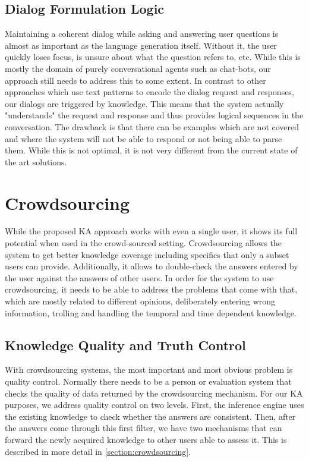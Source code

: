 \subsection{Dialog Formulation Logic}
Maintaining a coherent dialog while asking and answering user questions is 
almost as important as the language generation itself. Without it, the user 
quickly loses focus, is unsure about what the question refers to, etc. 
While this is mostly the domain of purely conversational agents such as 
chat-bots\parencite{Bradesko2012}, our approach still needs to address this to 
some extent. In contrast to other approaches which use text patterns to encode 
the dialog request and responses, our dialogs are triggered by knowledge. 
This means that the system actually "understands" the request and response and 
thus provides logical sequences in the conversation. The drawback is that there
can be examples which are not covered and where the system will not be able to
respond or not being able to parse them. While this is not optimal, it is not 
very different from the current state of the art solutions.

\section{Crowdsourcing}
\label{section:bg:crowdsourcing}
While the proposed KA approach works with even a single user, it shows its 
full potential when used in the crowd-sourced setting. Crowdsourcing allows 
the system to get better knowledge coverage including specifics that only a 
subset users can provide. Additionally, it allows to double-check the answers 
entered by the user against the answers of other users. In order for the system 
to use crowdsourcing, it needs to be able to address the problems that come 
with that, which are mostly related to different opinions, deliberately entering 
wrong information, trolling and handling the temporal and time dependent 
knowledge.

\subsection{Knowledge Quality and Truth Control} 
With crowdsourcing systems, the most important and most obvious problem is 
quality control. Normally there needs to be a person or evaluation system that 
checks the quality of data returned by the crowdsourcing mechanism. For our 
KA purposes, we address quality control on two levels. First, the inference 
engine uses the existing knowledge to check whether the answers are consistent. 
Then, after the answers come through this first filter, we have two mechanisms 
that can forward the newly acquired knowledge to other users able to assess it. 
This is described in more detail in \autoref{section:crowdsourcing}.

